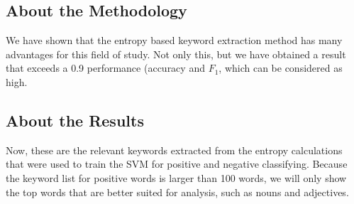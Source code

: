 \documentclass[review]{elsarticle}
\begin{document}
\subsection{About the Methodology}\label{disc_method}

We have shown that the entropy based keyword extraction method has many advantages for this field of study. Not only this, but we have obtained a result that exceeds a 0.9 performance (accuracy and \(F_1\), which can be considered as high.

\subsection{About the Results}\label{disc_res}

Now, these are the relevant keywords extracted from the entropy calculations that were used to train the SVM for positive and negative classifying. Because the keyword list for positive words is larger than 100 words, we will only show the top words that are better suited for analysis, such as nouns and adjectives.

\begin{table}[htp]
\centering
\caption{Keywords worthy of note}
\label{tab:keywords}
\end{table}
\end{document}
